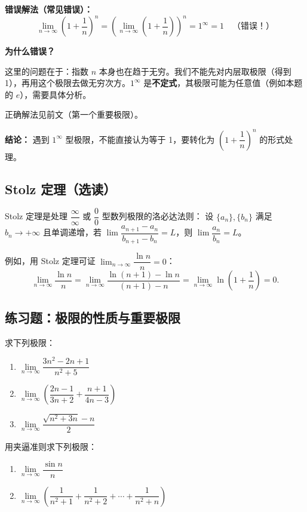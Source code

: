 \documentclass{ctexart}
\newenvironment{extra}{\begin{mdframed}[style=extrastyle, frametitle={* 选读内容（不要求掌握）}]}{\end{mdframed}}
\begin{document}
\begin{example}[加减结构中的错误示例]
\begin{example}[错误：拆分乘积中的无穷小量]
\textbf{错误解法（常见错误）：}
\[
\lim_{n\to\infty} \left(1 + \dfrac{1}{n}\right)^n = \left(\lim_{n\to\infty} \left(1 + \dfrac{1}{n}\right)\right)^n = 1^\infty = 1 \quad \text{（错误！）}
\]

\textbf{为什么错误？}

这里的问题在于：指数 \(n\) 本身也在趋于无穷。我们不能先对内层取极限（得到 1），再用这个极限去做无穷次方。\(1^\infty\) 是\textbf{不定式}，其极限可能为任意值（例如本题的 \(e\)），需要具体分析。

正确解法见前文（第一个重要极限）。

\textbf{结论：} 遇到 \(1^\infty\) 型极限，不能直接认为等于 1，要转化为 \((1 + \dfrac{1}{n})^n\) 的形式处理。
\end{example}



\begin{extra}
\subsection*{Stolz 定理（选读）}
Stolz 定理是处理 \(\dfrac{\infty}{\infty}\) 或 \(\dfrac{0}{0}\) 型数列极限的洛必达法则：
设 \(\{a_n\}, \{b_n\}\) 满足 \(b_n \to +\infty\) 且单调递增，若 \(\lim \dfrac{a_{n+1}-a_n}{b_{n+1}-b_n} = L\)，则 \(\lim \dfrac{a_n}{b_n} = L\)。

例如，用 Stolz 定理可证 \(\lim_{n\to\infty} \dfrac{\ln n}{n} = 0\)：
\[
\lim_{n\to\infty} \dfrac{\ln n}{n} = \lim_{n\to\infty} \dfrac{\ln(n+1) - \ln n}{(n+1)-n} = \lim_{n\to\infty} \ln\left(1+\dfrac{1}{n}\right) = 0.
\]
\end{extra}

\subsection*{练习题：极限的性质与重要极限}

\begin{exercise}求下列极限：
\begin{enumerate}
\item \(\lim\limits_{n\to\infty} \dfrac{3n^2 - 2n + 1}{n^2 + 5}\)
\item \(\lim\limits_{n\to\infty} \left(\dfrac{2n-1}{3n+2} + \dfrac{n+1}{4n-3}\right)\)
\item \(\lim\limits_{n\to\infty} \dfrac{\sqrt{n^2 + 3n} - n}{2}\)
\end{enumerate}
\end{exercise}

\begin{exercise}用夹逼准则求下列极限：
\begin{enumerate}
\item \(\lim\limits_{n\to\infty} \dfrac{\sin n}{n}\)
\item \(\lim\limits_{n\to\infty} \left(\dfrac{1}{n^2+1} + \dfrac{1}{n^2+2} + \cdots + \dfrac{1}{n^2+n}\right)\)
\end{enumerate}
\end{exercise}


\end{example}
\end{document}
